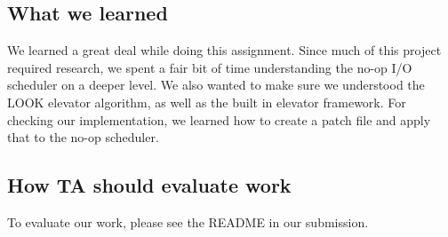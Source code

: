 \documentclass[onecolumn, draftclsnofoot,10pt, compsoc]{IEEEtran}
\begin{document}
\subsection{What we learned}
We learned a great deal while doing this assignment. Since much of this project required research, we spent a fair bit of time understanding the no-op I/O scheduler on a deeper level. We also wanted to make sure we understood the LOOK elevator algorithm, as well as the built in elevator framework. For checking our implementation, we learned how to create a patch file and apply that to the no-op scheduler. 
\subsection{How TA should evaluate work} To evaluate our work, please see the README in our submission. 
\end{document}
